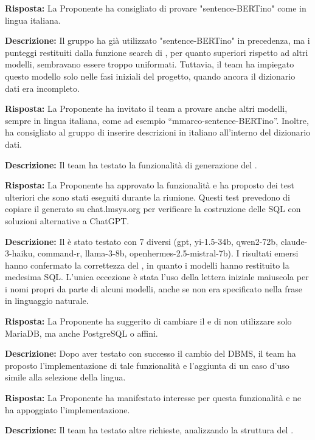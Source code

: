 \par \textbf{Risposta:} La Proponente ha consigliato di provare "sentence-BERTino" come  in lingua italiana.

\par \textbf{Descrizione:} Il gruppo ha già utilizzato "sentence-BERTino" in precedenza, ma i punteggi restituiti dalla funzione search di , per quanto superiori rispetto ad altri modelli, sembravano essere troppo uniformati. Tuttavia, il team ha impiegato questo modello solo nelle fasi iniziali del progetto, quando ancora il dizionario dati era incompleto.
\par \textbf{Risposta:} La Proponente ha invitato il team a provare anche altri modelli, sempre in lingua italiana, come ad esempio “mmarco-sentence-BERTino”. Inoltre, ha consigliato al gruppo di inserire descrizioni in italiano all'interno del dizionario dati.

\par \textbf{Descrizione:} Il team ha testato la funzionalità di generazione del .
\par \textbf{Risposta:} La Proponente ha approvato la funzionalità e ha proposto dei test ulteriori che sono stati eseguiti durante la riunione. Questi test prevedono di copiare il  generato su chat.lmsys.org per verificare la costruzione delle  SQL con soluzioni alternative a ChatGPT.
\par \textbf{Descrizione:} Il  è stato testato con 7  diversi (gpt, yi-1.5-34b, qwen2-72b, claude-3-haiku, command-r, llama-3-8b, openhermes-2.5-mistral-7b). I risultati emersi hanno confermato la correttezza del , in quanto i modelli hanno restituito la medesima  SQL. L'unica eccezione è stata l'uso della lettera iniziale maiuscola per i nomi propri da parte di alcuni modelli, anche se non era specificato nella frase in linguaggio naturale.

\par \textbf{Risposta:} La Proponente ha suggerito di cambiare il  e di non utilizzare solo MariaDB, ma anche PostgreSQL o affini.

\par \textbf{Descrizione:} Dopo aver testato con successo il cambio del DBMS, il team ha proposto l'implementazione di tale funzionalità e l'aggiunta di un caso d'uso simile alla selezione della lingua.

\par \textbf{Risposta:} La Proponente ha manifestato interesse per questa funzionalità e ne ha appoggiato l'implementazione.
\par \textbf{Descrizione:} Il team ha testato altre richieste, analizzando la struttura del .

